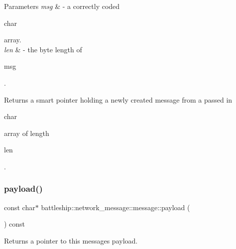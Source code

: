 \begin{DoxyParams}{Parameters}
{\em msg} & -\/ a correctly coded
\begin{DoxyCode}
\textcolor{keywordtype}{char} 
\end{DoxyCode}
 array. \\
\hline
{\em len} & -\/ the byte length of
\begin{DoxyCode}
msg 
\end{DoxyCode}
 .\\
\hline
\end{DoxyParams}
\begin{DoxyReturn}{Returns}
a smart pointer holding a newly created message from a passed in 
\begin{DoxyCode}
\textcolor{keywordtype}{char} 
\end{DoxyCode}
 array of length
\begin{DoxyCode}
len 
\end{DoxyCode}
 . 
\end{DoxyReturn}
\mbox{\label{classbattleship_1_1network__message_1_1message_ab42ddf52012135284f65641702459912}} 
\subsubsection{\texorpdfstring{payload()}{payload()}}
{\footnotesize\ttfamily const char$\ast$ battleship\+::network\+\_\+message\+::message\+::payload (\begin{DoxyParamCaption}{ }\end{DoxyParamCaption}) const\hspace{0.3cm}{\ttfamily [inline]}}

\begin{DoxyReturn}{Returns}
a pointer to this message\textquotesingle{}s payload. 
\end{DoxyReturn}
\mbox{\label{classbattleship_1_1network__message_1_1message_ac4a236888d40ffbdd8572660a3f34b1e}} 
